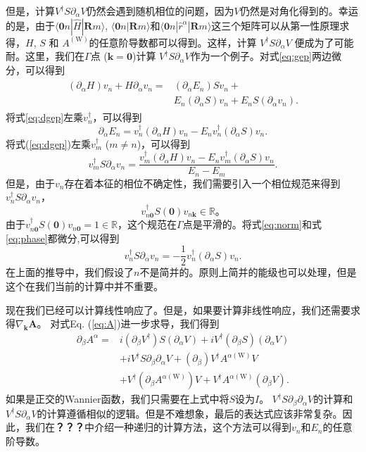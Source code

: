 但是，计算$V^{\dagger}S\partial_{\alpha}V$仍然会遇到随机相位的问题，因为$V$仍然是对角化得到的。幸运的是，由于$\langle\boldsymbol{0}n|\hat{H}|\boldsymbol{R}m\rangle$,
$\langle\boldsymbol{0}n|\boldsymbol{R}m\rangle$和$\langle\boldsymbol{0}n|\hat{r}^{\alpha}|\boldsymbol{R}m\rangle$这三个矩阵可以从第一性原理求得，$H$, $S$ 和 $A^{(\text{W})}$的任意阶导数都可以得到。这样，计算 $V^{\dagger}S\partial_{\alpha}V$ \cite{van2007computation}便成为了可能耐。这里，我们在$\Gamma$点 ($\boldsymbol{k}=\boldsymbol{0}$)计算
$V^{\dagger}S\partial_{\alpha}V$作为一个例子。对式\ref{eq:gep}两边微分，可以得到
\begin{align}
\begin{split}
(\partial_\alpha H)v_n+H\partial_\alpha v_n = & (\partial_\alpha E_n)Sv_n+\\
& E_n(\partial_\alpha S)v_n+E_n S(\partial_\alpha v_n).\label{eq:dgep}
\end{split}
\end{align}
将式\ref{eq:dgep}左乘$v_{n}^{\dagger}$，可以得到
\[
\partial_\alpha E_{n}=v_{n}^{\dagger}(\partial_\alpha H) v_{n}-E_{n}v_{n}^{\dagger}(\partial_\alpha S)v_{n}.
\]
将式(\ref{eq:dgep})左乘$v_{m}^{\dagger}$ ($m\ne n$)，可以得到
\[
v_{m}^{\dagger}S\partial_\alpha v_{n}=\frac{v_{m}^{\dagger}(\partial_\alpha H)v_{n}-E_{n}v_{m}^{\dagger}(\partial_\alpha S)v_{n}}{E_n-E_m}.
\]
但是，由于$v_{n}$存在着本征的相位不确定性，我们需要引入一个相位规范来得到$v_{n}^{\dagger}S \partial_\alpha v_{n}$，
\begin{equation}
v_{n\boldsymbol{0}}^{\dagger}S(\boldsymbol{0})v_{n\boldsymbol{k}}\in\mathbb{R}。\label{eq:phase}
\end{equation}
由于$v_{n\boldsymbol{0}}^{\dagger}S(\boldsymbol{0})v_{n\boldsymbol{0}}=1\in\mathbb{R}$，这个规范在$\Gamma$点是平滑的。将式\ref{eq:norm}和式\ref{eq:phase}都微分,可以得到
\[
v_{n}^{\dagger}S\partial_\alpha v_n=-\frac{1}{2}v_{n}^{\dagger}(\partial_\alpha S)v_n.
\]
在上面的推导中，我们假设了$n$不是简并的。原则上简并的能级也可以处理\cite{andrew1998computation}，但是这个在我们当前的计算中并不重要。

现在我们已经可以计算线性响应了。但是，如果要计算非线性响应，我们还需要求得$\nabla_{\boldsymbol{k}}\boldsymbol{A}$。 对式Eq. (\ref{eq:A})进一步求导，我们得到
\begin{equation}
\begin{split}
\partial_{\beta}A^{\alpha}  = &i(\partial_{\beta}V^{\dagger})S(\partial_{\alpha}V)+iV^{\dagger}(\partial_{\beta}S)(\partial_{\alpha}V)\\
&+iV^{\dagger}S\partial_{\beta}\partial_{\alpha}V+(\partial_{\beta})V^{\dagger}A^{\alpha(\text{W})}V\\
&+V^{\dagger}(\partial_{\beta}A^{\alpha(\text{W})})V+V^{\dagger}A^{\alpha(\text{W})}(\partial_{\beta}V).
\end{split}
\end{equation}
如果是正交的Wannier函数\cite{wang_first-principles_2017}，我们只需要在上式中将$S$设为$I$。 $V^{\dagger}S\partial_{\beta}\partial_{\alpha}V$的计算和$V^{\dagger}S\partial_{\alpha}V$的计算遵循相似的逻辑。但是不难想象，最后的表达式应该非常复杂。因此，我们在\textbf{？？？}中介绍一种递归的计算方法，这个方法可以得到$v_n$和$E_{n}$的任意阶导数。


